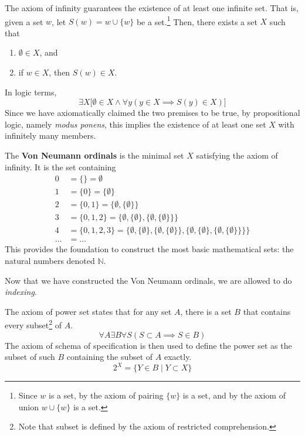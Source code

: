   \begin{axiom}
    The axiom of infinity guarantees the existence of at least one infinite set. That is, given a set $w$, let $S(w) = w \cup \{w\}$ be a set.\footnote{Since $w$ is a set, by the axiom of pairing $\{w\}$ is a set, and by the axiom of union $w \cup \{w\}$ is a set.} Then, there exists a set $X$ such that 
    \begin{enumerate}
      \item $\emptyset \in X$, and 
      \item if $w \in X$, then $S(w) \in X$. 
    \end{enumerate} 
    In logic terms, 
    \begin{equation}
      \exists X \big[ \emptyset \in X \land \forall y (y \in X \implies S(y) \in X) \big]
    \end{equation}
    Since we have axiomatically claimed the two premises to be true, by propositional logic, namely \textit{modus ponens}, this implies the existence of at least one set $X$ with infinitely many members. 
  \end{axiom}

  \begin{definition} 
     The \textbf{Von Neumann ordinals} is the minimal set $X$ satisfying the axiom of infinity. It is the set containing 
    \begin{align*}
      0 & = \{\} = \emptyset \\
      1 & = \{0\} = \{\emptyset\} \\
      2 & = \{0,1\} = \{\emptyset,\{\emptyset\}\} \\
      3 & = \{0,1,2\} = \{\emptyset,\{\emptyset\},\{\emptyset,\{\emptyset\}\}\} \\
      4 & = \{0,1,2,3\} = \{\emptyset,\{\emptyset\},\{\emptyset,\{\emptyset\}\},\{\emptyset,\{\emptyset\},\{\emptyset,\{\emptyset\}\}\}\} \\
      \ldots & = \ldots 
    \end{align*} 
    This provides the foundation to construct the most basic mathematical sets: the natural numbers denoted $\mathbb{N}$.  
  \end{definition} 

  Now that we have constructed the Von Neumann ordinals, we are allowed to do \textit{indexing}. 

  \begin{axiom}
    The axiom of power set states that for any set $A$, there is a set $B$ that contains every subset\footnote{Note that subset is defined by the axiom of restricted comprehension.} of $A$. 
    \begin{equation}
      \forall A \exists B \forall S (S \subset A \implies S \in B)
    \end{equation}
    The axiom of schema of specification is then used to define the power set as the subset of such $B$ containing the subset of $A$ exactly. 
    \begin{equation}
      2^X = \{Y \in B \mid Y \subset X \}
    \end{equation}
  \end{axiom} 

